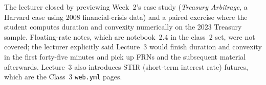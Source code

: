 The lecturer closed by previewing Week~2's case study (\emph{Treasury
Arbitrage}, a Harvard case using 2008 financial-crisis data) and a paired
exercise where the student computes duration and convexity numerically on
the 2023 Treasury sample. Floating-rate notes, which are notebook~2.4 in
the class~2 set, were not covered; the lecturer explicitly said Lecture~3
would finish duration and convexity in the first forty-five minutes and
pick up FRNs and the subsequent material afterwards. Lecture~3 also
introduces STIR (short-term interest rate) futures, which are the Class~3
\texttt{web.yml} pages.
